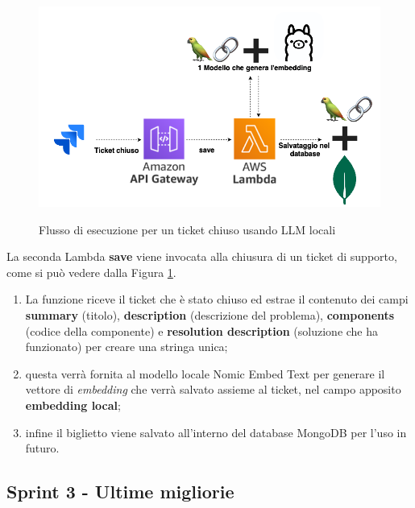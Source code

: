 \begin{figure}[H]
    \centering
    \includegraphics[alt={Flusso di esecuzione il salvataggio di un ticket chiuso}, width=1\columnwidth]{img/ticketChiusoLocale.png}
    \caption{Flusso di esecuzione per un ticket chiuso usando LLM locali}
    \label{fig:flow_chart_closed_ticket}
\end{figure}

La seconda Lambda \textbf{save} viene invocata alla chiusura di un ticket di supporto, come si può vedere dalla Figura \ref{fig:flow_chart_closed_ticket}.
\begin{enumerate}
    \item La funzione riceve il ticket che è stato chiuso ed estrae il contenuto dei campi \textbf{summary} (titolo), \textbf{description} (descrizione del problema), \textbf{components} (codice della componente) e \textbf{resolution description} (soluzione che ha funzionato) per creare una stringa unica; 
    \item questa verrà fornita al modello locale Nomic Embed Text per generare il vettore di \textit{embedding} che verrà salvato assieme al ticket, nel campo apposito \textbf{embedding local};
    \item infine il biglietto viene salvato all'interno del database MongoDB per l'uso in futuro.
\end{enumerate}

\subsection{Sprint 3 - Ultime migliorie}

